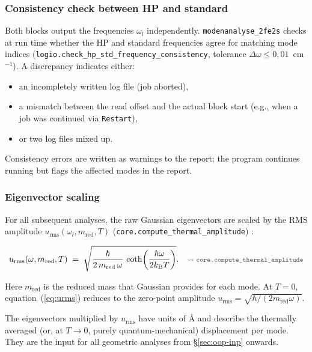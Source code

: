 \documentclass[11pt,a4paper,twoside]{article}
\newcommand{\kB}{k_{\mathrm{B}}}
\newcommand{\urms}{u_{\mathrm{rms}}}
\newcommand{\codref}[1]{%
  \quad\text{\textcolor{gray!70!black}{\footnotesize $\rightsquigarrow$~\texttt{#1}}}}
\theoremstyle{remark}
\begin{document}
\subsubsection*{Consistency check between HP and standard}
\label{sec:hp-std-check}

Both blocks output the frequencies $\omega_l$ independently.
\texttt{modenanalyse\_2fe2s} checks at run time whether the HP and
standard frequencies agree for matching mode indices
(\texttt{logio.check\_hp\_std\_frequency\_consistency}, tolerance
$\Delta\omega \leq 0{,}01$~cm$^{-1}$). A discrepancy indicates either:

\begin{itemize}
  \item an incompletely written log file (job aborted),
  \item a mismatch between the read offset and the actual block
        start (e.g., when a job was continued via \texttt{Restart}),
  \item or two log files mixed up.
\end{itemize}

Consistency errors are written as warnings to the report; the
program continues running but flags the affected modes in the
report.

\subsubsection*{Eigenvector scaling}

For all subsequent analyses, the raw Gaussian eigenvectors are
scaled by the RMS amplitude
$\urms(\omega_l, m_{\mathrm{red}}, T)$
(\texttt{core.compute\_thermal\_amplitude})
\cite{Achterhold2002,WilsonDeciusCross1955}:

\begin{equation}
  \urms(\omega, m_{\mathrm{red}}, T) \;=\;
  \sqrt{\frac{\hbar}{2\,m_{\mathrm{red}}\,\omega} \,
        \coth\!\left(\frac{\hbar\omega}{2\kB T}\right)} .
  \codref{core.compute\_thermal\_amplitude}
  \label{eq:urms}
\end{equation}

Here $m_{\mathrm{red}}$ is the reduced mass that Gaussian provides
for each mode. At $T=0$, equation~(\ref{eq:urms}) reduces to the
zero-point amplitude
$\urms = \sqrt{\hbar / (2 m_{\mathrm{red}} \omega)}$.

The eigenvectors multiplied by $\urms$ have units of \AA{} and
describe the thermally averaged (or, at $T \to 0$, purely
quantum-mechanical) displacement per mode. They are the input for
all geometric analyses from \S\ref{sec:oop-inp} onwards.
\end{document}
